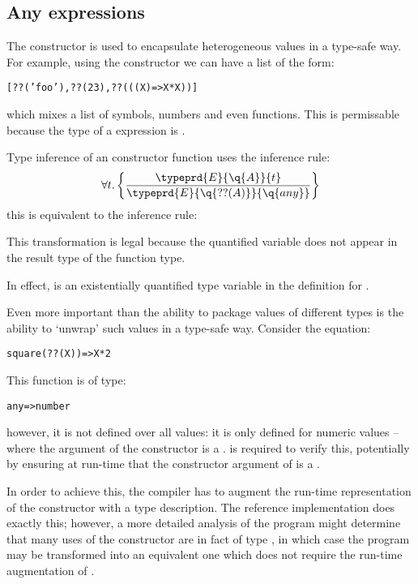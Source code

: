 \subsection{Any expressions}
\label{expression:any}

The  constructor is used to encapsulate heterogeneous values in a type-safe way. For example, using the  constructor we can have a list of the form:
\begin{alltt}
[??('foo'), ??(23), ??(((X)=>X*X))]
\end{alltt}
which mixes a list of symbols, numbers and even functions. This is permissable because the type of a  expression is .

Type inference of an  constructor function uses the inference rule:
\begin{equation*}
\forall t.\left\{\frac{\typeprd{E}{\q{A}}{t}}{\typeprd{E}{\q{??(A)}}{\q{any}}}\right\}
\end{equation*}
this is equivalent to the inference rule:
\begin{prooftree}
\end{prooftree}
This transformation is legal because the quantified variable does not appear in the result type of the function type.

In effect,  is an existentially quantified type variable in the definition for .

Even more important than the ability to package values of different types is the ability to `unwrap' such values in a type-safe way. Consider the equation:
\begin{alltt}
square(??(X)) => X*2
\end{alltt}
This function is of type:
\begin{alltt}
any=>number
\end{alltt}
however, it is not defined over all  values: it is only defined for numeric  values -- where the argument of the  constructor is a . \go is required to verify this, potentially by ensuring at run-time that the constructor argument of  is a .

In order to achieve this, the \go compiler has to augment the run-time representation of the  constructor with a type description. The \go reference implementation does exactly this; however, a more detailed analysis of the program might determine that many uses of the  constructor are in fact of type , in which case the program may be transformed into an equivalent one which does not require the run-time augmentation of .


